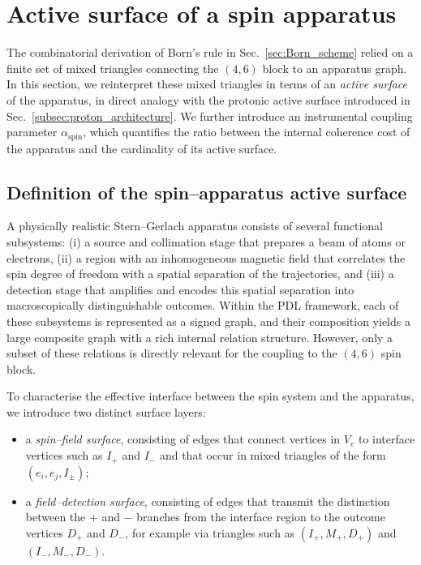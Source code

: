 \documentclass[11pt,a4paper]{article}
\numberwithin{equation}{section}
\begin{document}
\section{Active surface of a spin apparatus}
\label{sec:active_surface_spin}

The combinatorial derivation of Born’s rule in Sec.~\ref{sec:Born_scheme} relied on a finite set of mixed triangles connecting the $(4,6)$ block to an apparatus graph. In this section, we reinterpret these mixed triangles in terms of an \emph{active surface} of the apparatus, in direct analogy with the protonic active surface introduced in Sec.~\ref{subsec:proton_architecture}. We further introduce an instrumental coupling parameter $\alpha_{\text{spin}}$, which quantifies the ratio between the internal coherence cost of the apparatus and the cardinality of its active surface.

\subsection{Definition of the spin–apparatus active surface}
\label{subsec:active_surface_def}

A physically realistic Stern–Gerlach apparatus consists of several functional subsystems: (i) a source and collimation stage that prepares a beam of atoms or electrons, (ii) a region with an inhomogeneous magnetic field that correlates the spin degree of freedom with a spatial separation of the trajectories, and (iii) a detection stage that amplifies and encodes this spatial separation into macroscopically distinguishable outcomes. Within the PDL framework, each of these subsystems is represented as a signed graph, and their composition yields a large composite graph with a rich internal relation structure. However, only a subset of these relations is directly relevant for the coupling to the $(4,6)$ spin block.

To characterise the effective interface between the spin system and the apparatus, we introduce two distinct surface layers:
\begin{itemize}
  \item a \emph{spin–field surface}, consisting of edges that connect vertices in $V_e$ to interface vertices such as $I_+$ and $I_-$ and that occur in mixed triangles of the form $(e_i,e_j,I_\pm)$;
  \item a \emph{field–detection surface}, consisting of edges that transmit the distinction between the $+$ and $-$ branches from the interface region to the outcome vertices $D_+$ and $D_-$, for example via triangles such as $(I_+,M_+,D_+)$ and $(I_-,M_-,D_-)$.
\end{itemize}
\end{document}
